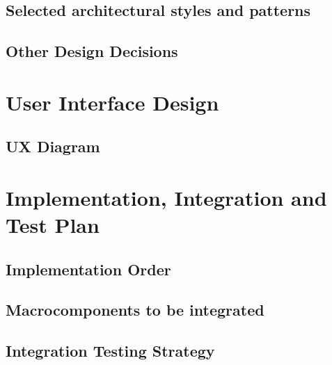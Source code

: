 \documentclass[12pt]{article}
\begin{document}
\subsection{Selected architectural styles and patterns}

\subsection{Other Design Decisions}

\clearpage
\section{User Interface Design}
\subsection{UX Diagram}

\clearpage
\section{Implementation, Integration and Test Plan}
\subsection{Implementation Order}

\subsection{Macrocomponents to be integrated}
\subsection{Integration Testing Strategy}

\end{document}
